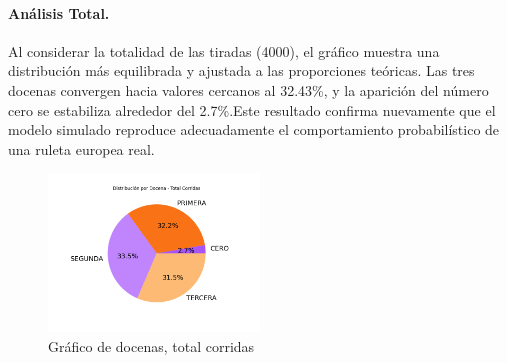 \documentclass{article}
\begin{document}
\paragraph{Análisis Total.}
Al considerar la totalidad de las tiradas (4000), el gráfico muestra una distribución más equilibrada y ajustada a las proporciones teóricas. Las tres docenas convergen hacia valores cercanos al 32.43\%, y la aparición del número cero se estabiliza alrededor del 2.7\%.Este resultado confirma nuevamente que el modelo simulado reproduce adecuadamente el comportamiento probabilístico de una ruleta europea real.
 \begin{figure} [htbp]
    \centering
    \includegraphics[width=0.5\textwidth]{Imagenes/GraficoTortaTotalCorridas.png}
    \caption{Gráfico de docenas, total corridas}
\end{figure}
\end{document}
